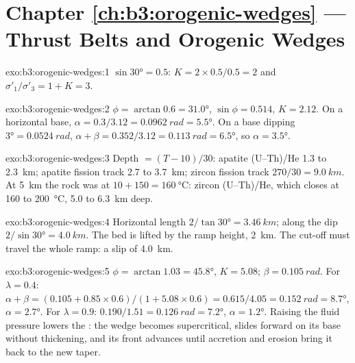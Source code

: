\section*{Chapter \ref{ch:b3:orogenic-wedges} --- Thrust Belts and Orogenic Wedges}

\begin{solution}{exo:b3:orogenic-wedges:1}
$\sin\ang{30} = 0.5$: $K = 2\times0.5/0.5 = 2$ and $\sigma'_1/\sigma'_3 = 1 +
K = 3$.
\end{solution}

\begin{solution}{exo:b3:orogenic-wedges:2}
$\phi = \arctan0.6 = \ang{31.0}$, $\sin\phi = 0.514$, $K = 2.12$. On a
horizontal base, $\alpha = 0.3/3.12 = \qty{0.0962}{rad} = \ang{5.5}$. On a
base dipping $\ang{3} = \qty{0.0524}{rad}$, $\alpha + \beta = 0.352/3.12 =
\qty{0.113}{rad} = \ang{6.5}$, so $\alpha = \ang{3.5}$.
\end{solution}

\begin{solution}{exo:b3:orogenic-wedges:3}
Depth $= (T - 10)/30$: apatite (U--Th)/He 1.3 to \qty{2.3}{km}; apatite fission
track 2.7 to \qty{3.7}{km}; zircon fission track $270/30 = \qty{9.0}{km}$. At
\qty{5}{km} the rock was at $10 + 150 = \qty{160}{\celsius}$: zircon
(U--Th)/He, which closes at 160 to \qty{200}{\celsius}, 5.0 to
\qty{6.3}{km} deep.
\end{solution}

\begin{solution}{exo:b3:orogenic-wedges:4}
Horizontal length $2/\tan\ang{30} = \qty{3.46}{km}$; along the dip
$2/\sin\ang{30} = \qty{4.0}{km}$. The bed is lifted by the ramp height,
\qty{2}{km}. The cut-off must travel the whole ramp: a slip of
\qty{4.0}{km}.
\end{solution}

\begin{solution}{exo:b3:orogenic-wedges:5}
$\phi = \arctan1.03 = \ang{45.8}$, $K = 5.08$; $\beta = \qty{0.105}{rad}$.
For $\lambda = 0.4$: $\alpha + \beta = (0.105 + 0.85\times0.6)/(1 +
5.08\times0.6) = 0.615/4.05 = \qty{0.152}{rad} = \ang{8.7}$, $\alpha =
\ang{2.7}$. For $\lambda = 0.9$: $0.190/1.51 = \qty{0.126}{rad} = \ang{7.2}$,
$\alpha = \ang{1.2}$. Raising the fluid pressure lowers the :
the wedge becomes supercritical, slides forward on its base without
thickening, and its front advances until accretion and erosion bring it back
to the new taper.
\end{solution}


